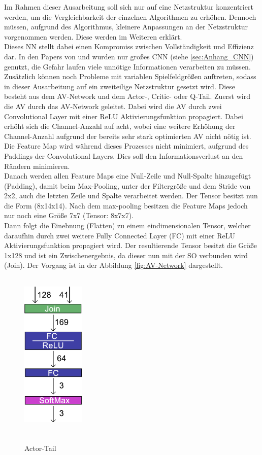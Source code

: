 Im Rahmen dieser Ausarbeitung soll sich nur auf eine Netzstruktur konzentriert werden, um die Vergleichbarkeit der einzelnen Algorithmen zu erhöhen. Dennoch müssen, aufgrund des Algorithmus, kleinere Anpassungen an der Netzstruktur vorgenommen werden. Diese werden im Weiteren erklärt.\\
Dieses NN stellt dabei einen Kompromiss zwischen Vollständigkeit und Effizienz dar. In den Papers von \cite{Autonomous_Agents_in_Snake_Game_via_DRL} und \cite{UAV} wurden nur großes CNN (siehe \ref{sec:Anhang_CNN}) genutzt, die Gefahr laufen viele unnötige Informationen verarbeiten zu müssen. Zusätzlich können noch Probleme mit variablen Spielfeldgrößen auftreten, sodass in dieser Ausarbeitung auf ein zweiteilige Netzstruktur gesetzt wird. Diese besteht aus dem AV-Network und dem Actor-, Critic- oder Q-Tail.
Zuerst wird die AV durch das AV-Network geleitet. 
Dabei wird die AV durch zwei Convolutional Layer mit einer ReLU Aktivierungsfunktion propagiert. Dabei erhöht sich die Channel-Anzahl auf acht, wobei eine weitere Erhöhung der Channel-Anzahl aufgrund der bereits sehr stark optimierten AV nicht nötig ist. Die Feature Map wird während dieses Prozesses nicht minimiert, aufgrund des Paddings der Convolutional Layers. Dies soll den Informationsverlust an den Rändern minimieren.\\  
Danach werden allen Feature Maps eine Null-Zeile und Null-Spalte hinzugefügt (Padding), damit beim Max-Pooling, unter der Filtergröße und dem Stride von 2x2, auch die letzten Zeile und Spalte verarbeitet werden. Der Tensor besitzt nun die Form (8x14x14). Nach dem max-pooling besitzen die Feature Maps jedoch nur noch eine Größe 7x7 (Tensor: 8x7x7).\\ 
Dann folgt die Einebnung (Flatten) zu einem eindimensionalen Tensor, welcher daraufhin durch zwei weitere Fully Connected Layer (FC) mit einer ReLU Aktivierungsfunktion propagiert wird. Der resultierende Tensor besitzt die Größe 1x128 und ist ein Zwischenergebnis, da dieser nun mit der SO verbunden wird (Join). Der Vorgang ist in der Abbildung \ref{fig:AV-Network} dargestellt.
\begin{figure}
	\centering
	\includegraphics[width=3.0cm, height=8.0cm]{Abbildungen/Actor.png}
	\caption[Actor-Head]{\\Actor-Tail}
	\label{fig:Actor_Tail}
\end{figure}

